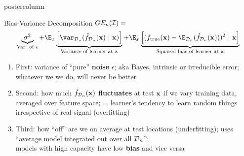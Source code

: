 \documentclass{beamer}
\begin{document}
\begin{frame}[fragile]{}
\begin{columns}
\begin{column}{.31\textwidth}
\begin{beamercolorbox}[center]{postercolumn}
\begin{minipage}{.98\textwidth}
{\begin{myblock}{Bias-Variance Decomposition}
$GE_n(\mathcal{I}) =$  
$$
 \underbrace{\sigma^2}_{\text{Var. of $\epsilon$}} + \E_{x}\underbrace{\left[\var_{\D_n}(\fh_{\D_n}(\xv) ~|~\xv)\right]}_{\text{Variance of learner at } \xv} + \E_{x}\underbrace{\left[(\ftrue(\xv)-\E_{\D_n}(\fh_{\D_n}(\xv)))^2~|~\xv\right]}_{\text{Squared bias of learner at } \xv}  
$$

\begin{enumerate}
  \item First: variance of ``pure''
     \textbf{noise} $\epsilon$; aka Bayes, intrinsic or irreducible error; 
    whatever we we do, will never be better
  \item Second: how much \textbf{$\hat{f}_{\mathcal{D}_n}(\mathbf{x})$ fluctuates} at test $\mathbf{x}$ if we vary training data, averaged over feature space; = learner's tendency to learn random things irrespective of real signal (overfitting)
  
  \item Third: how ``off'' are we on average at test locations (underfitting); uses ``average model integrated out over all $\mathcal{D}_n$''; \\
  models with high capacity have low \textbf{bias} and vice versa
\end{enumerate}

  \end{myblock}


}
\end{minipage}
\end{beamercolorbox}
\end{column}



\end{columns}
\end{frame}
\end{document}
